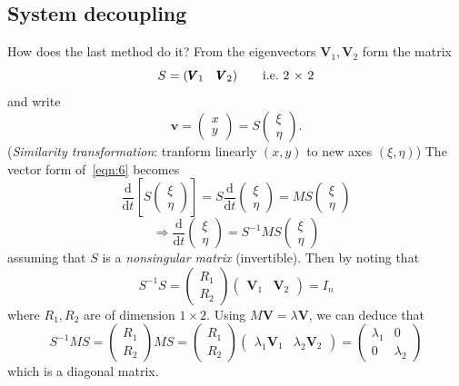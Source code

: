 \documentclass[12pt]{report}
\theoremstyle{definition}
\begin{document}
\subsection{System decoupling}
How does the last method do it? From the eigenvectors $\pmb{V}_1, \pmb{V}_2$ form the matrix\[
    S = (\pmb{V}_1 \quad \pmb{V}_2) \qquad\textnormal{i.e.\ 2 $\times$ 2}
\]and write \[\pmb{v} = \begin{pmatrix}
        x \\
        y
    \end{pmatrix} = S\begin{pmatrix}
            \xi \\
            \eta
    \end{pmatrix}.
\](\emph{Similarity transformation}: tranform linearly $(x,y)$ to new axes $(\xi, \eta)$)
The vector form of~\eqref{eqn:6} becomes\[
    \frac{\mathrm{d}}{\mathrm{d}t} \left[S \begin{pmatrix}
            \xi \\
            \eta
    \end{pmatrix} \right] 
    = S\frac{\mathrm{d}}{\mathrm{d}t} \begin{pmatrix}
            \xi \\
            \eta
    \end{pmatrix} 
    = MS\begin{pmatrix}
            \xi \\
            \eta
    \end{pmatrix} 
\]\[
    \Rightarrow{}\frac{\mathrm{d}}{\mathrm{d}t} \begin{pmatrix}
            \xi \\
            \eta
    \end{pmatrix} = S^{-1}MS\begin{pmatrix}
            \xi \\
            \eta
    \end{pmatrix} 
\]assuming that $S$ is a \emph{nonsingular matrix} (invertible).  
Then by noting that\[
    S^{-1}S = \begin{pmatrix}
            R_1 \\
            R_2
    \end{pmatrix} \begin{pmatrix}
    \pmb{V}_1 & \pmb{V}_2
    \end{pmatrix} = I_n
\]where $R_1, R_2$ are of dimension $1 \times 2$.
Using $M\pmb{V} = \lambda \pmb{V}$, we can deduce that\[
    S^{-1}MS = \begin{pmatrix}
            R_1 \\
            R_2
    \end{pmatrix} MS = \begin{pmatrix}
            R_1 \\
            R_2
    \end{pmatrix} \begin{pmatrix}
    \lambda_1 \pmb{V}_1 & \lambda_2 \pmb{V}_2
    \end{pmatrix} = \begin{pmatrix}
    \lambda_1 & 0 \\
    0 & \lambda_2
    \end{pmatrix} 
\]which is a diagonal matrix. 
\end{document}
